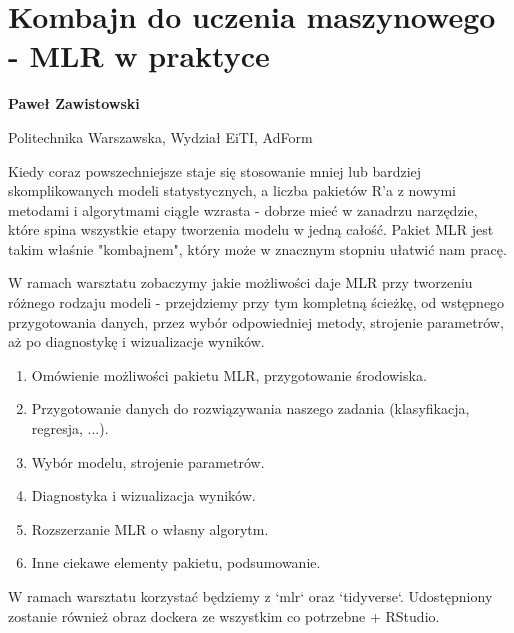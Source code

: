 \documentclass[\main/boa.tex]{subfiles}
\begin{document}
\section{Kombajn do uczenia maszynowego - MLR w praktyce}

\begin{minipage}{0.915\textwidth}
\centering
{\bf {} Paweł Zawistowski}
\end{minipage}

\vskip 0.3cm

\begin{affiliations}
\begin{minipage}{0.915\textwidth}
\centering
\large Politechnika Warszawska, Wydział EiTI, AdForm  \\[2pt]
\end{minipage}
\end{affiliations}

\vskip 0.8cm

\opiswarsztatu Kiedy coraz powszechniejsze staje się stosowanie mniej lub bardziej skomplikowanych modeli statystycznych, a liczba pakietów R'a z nowymi metodami i algorytmami ciągle wzrasta - dobrze mieć w zanadrzu narzędzie, które spina wszystkie etapy tworzenia modelu w jedną całość. Pakiet MLR jest takim właśnie "kombajnem", który może w znacznym stopniu ułatwić nam pracę. 

W ramach warsztatu zobaczymy jakie możliwości daje MLR przy tworzeniu różnego rodzaju modeli - przejdziemy przy tym kompletną ścieżkę, od wstępnego przygotowania danych, przez wybór odpowiedniej metody, strojenie parametrów, aż po diagnostykę i wizualizacje wyników.

\planwarsztatu
\begin{enumerate}
\item Omówienie możliwości pakietu MLR, przygotowanie środowiska.
\item Przygotowanie danych do rozwiązywania naszego zadania (klasyfikacja, regresja, ...).
\item Wybór modelu, strojenie parametrów.
\item Diagnostyka i wizualizacja wyników.
\item Rozszerzanie MLR o własny algorytm.
\item Inne ciekawe elementy pakietu, podsumowanie.
\end{enumerate}	 

\pakiety W ramach warsztatu korzystać będziemy z `mlr` oraz `tidyverse`. Udostępniony zostanie również obraz dockera ze wszystkim co potrzebne + RStudio.
\end{document}
